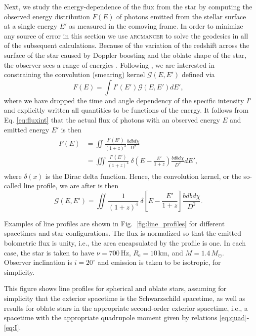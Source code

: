 \documentclass{aa}
\newcommand{\be}{\begin{equation}}
\newcommand{\ee}{\end{equation}}
\newcommand{\refe}[1]{#1}
\newcommand{\refedel}[1]{}
\newcommand{\sch}{Schwarzschild }
\newcommand{\Msun}{\ensuremath{M_{\odot}}}
\begin{document}
\refe{Next, we study the energy-dependence of the flux from the star by computing the observed energy distribution $F(E)$ of photons emitted from the stellar surface at a single energy $E'$ as measured in the comoving frame. 
\refe{In order to minimize any source of error in this section we use \textsc{arcmancer} to solve the geodesics in all of the subsequent calculations.}
Because of the variation of the redshift across the surface of the star caused by Doppler boosting and the oblate shape of the star, the observer sees a range of energies} \citep{OP03,BML06,CMB06}.
Following \citealt{Baubock15}, we are interested in constraining the convolution (smearing) kernel $\mathcal{G}(E,E')$ defined via
\be
F(E) = \int I'(E') \mathcal{G}(E,E') dE',
\ee
where we have dropped the time and angle dependency of the specific intensity $I'$ and explicitly written all quantities to be functions of the energy.
It follows from Eq. \eqref{eq:fluxint} that the actual flux of photons with an observed energy $E$ and emitted energy $E'$ is then
\begin{align}\begin{split}
    F(E) &= \iint \frac{ I'(E') }{ (1+z)^3 } \frac{bdb d\chi}{D^2} \\
         &= \iiint \frac{I'(E') }{(1+z)^4} ~ \delta \left( E - \frac{E'}{1+z} \right)  \frac{bdb d\chi}{D^2} dE',
\end{split}\end{align}
where $\delta(x)$ is the Dirac delta function.
Hence, the convolution kernel, or the so-called line profile, we are after is then 
\be
\mathcal{G}(E,E') =  \iint \frac{1}{(1+z)^4} ~\delta \left[E - \frac{E'}{1+z} \right]  \frac{bdb d\chi}{D^2}.
\ee

Examples of line profiles are shown in Fig.~\ref{fig:line_profiles} for different spacetimes and star configurations.
The flux is normalized so that the emitted bolometric flux is unity, i.e., the area encapsulated by the profile is one.
In each case, the star is taken to have $\nu = 700\,\mathrm{Hz}$, $R_{\mathrm{e}} = 10\,\mathrm{km}$, and $M=1.4\,\Msun$.
Observer inclination is $i=20^{\circ}$ and emission is taken to be isotropic, for simplicity.
\refedel{We consider a \sch spacetime for spherical and oblate stars, with radius given by Eq.~\eqref{eq:radf}, in addition to a full second-order spacetime with quadrupole moments and an oblate neutron star surface.}
\refe{
This figure shows line profiles for spherical and oblate stars, assuming for simplicity that the exterior spacetime is the Schwarzschild spacetime, as well as results for oblate stars in the appropriate second-order exterior spacetime, 
i.e., a spacetime with the appropriate quadrupole moment given by relations \eqref{eq:quad}-\eqref{eq:I}.
}
\end{document}
